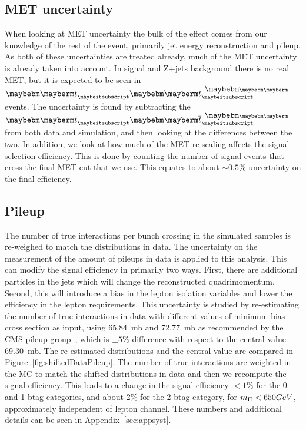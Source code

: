 
\subsection{MET uncertainty}

When looking at MET uncertainty the bulk of the effect comes from our knowledge of the rest of the event, primarily jet energy reconstruction and pileup.  As both of these uncertainties are treated already, much of the MET uncertainty is already taken into account.  In signal and Z+jets background there is no real MET, but it is expected to be seen in $\Pqt \Paqt$ events.  The uncertainty is found by subtracting the $\Pqt \Paqt$ from both data and simulation, and then looking at the differences between the two. In addition, we look at how much of the MET re-scaling affects the signal selection efficiency.  This is done by counting the number of signal events that cross the final MET cut that we use.  This equates to about $\sim 0.5$\% uncertainty on the final efficiency.

\subsection{Pileup}
\label{sec:pileupSystematics}
The number of true interactions per bunch crossing in the simulated samples is re-weighed to match the distributions in data. The uncertainty on the measurement of the amount of pileups in data is applied to this analysis. This can modify the signal efficiency in primarily two ways.  First, there are additional particles in the jets which will change the reconstructed quadrimomentum.  Second, this will introduce a bias in the lepton isolation variables and lower the efficiency in the lepton requirements. 
  This uncertainty is studied by re-estimating the number of true interactions in data with different values of minimum-bias cross section as input, using 65.84~mb and 72.77~mb as recommended by the CMS pileup group~\cite{pileupsys}, which is $\pm 5\%$ difference with respect to the central value 69.30~mb. The re-estimated distributions and the central value are compared in Figure~\ref{fig:shiftedDataPileup}. The number of true interactions are weighted in the MC to match the shifted distributions in data and then we recompute the signal efficiency. This leads to a change in the signal efficiency $< 1\%$ for the 0- and 1-btag categories, and about 2\% for the 2-btag category, for $m_{\mathrm{H}} < 650 GeV$, approximately independent of lepton channel.  These numbers and additional details can be seen in Appendix~\ref{sec:appsyst}.


